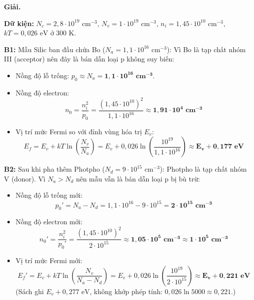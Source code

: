 \documentclass[11pt,a4paper]{article}
\renewcommand{\boldsymbol}[1]{\symbf{#1}}
\let\DeBaiOriginal\DeBai
\renewcommand{\DeBai}[1]{\par\Needspace{5\baselineskip}\DeBaiOriginal{#1}}
\begin{document}

\textbf{Giải.}

\textbf{Dữ kiện:} $N_c = 2{,}8 \cdot 10^{19}\text{ cm}^{-3}$, $N_v = 1 \cdot 10^{19}\text{ cm}^{-3}$, $n_i = 1{,}45 \cdot 10^{10}\text{ cm}^{-3}$, $kT = 0{,}026\text{ eV}$ ở $300\text{ K}$.

\textbf{B1:} Mẫu Silic ban đầu chứa Bo ($N_a = 1{,}1 \cdot 10^{16}\text{ cm}^{-3}$):
Vì Bo là tạp chất nhóm III (acceptor) nên đây là bán dẫn loại p không suy biến:
\begin{itemize}[leftmargin=*, topsep=1pt, itemsep=1pt]
  \item Nồng độ lỗ trống: $p_0 \approx N_a = \boldsymbol{1{,}1 \cdot 10^{16}\text{ cm}^{-3}}$.
  \item Nồng độ electron:
  \begin{equation*}
      n_0 = \frac{n_i^2}{p_0} = \frac{(1{,}45 \cdot 10^{10})^2}{1{,}1 \cdot 10^{16}} \approx \boldsymbol{1{,}91 \cdot 10^4\text{ cm}^{-3}}
  \end{equation*}
  \item Vị trí mức Fermi so với đỉnh vùng hóa trị $E_v$:
  \begin{equation*}
      E_f = E_v + kT \ln\left(\frac{N_v}{N_a}\right) = E_v + 0{,}026 \ln\left(\frac{10^{19}}{1{,}1 \cdot 10^{16}}\right) \approx \boldsymbol{E_v + 0{,}177\text{ eV}}
  \end{equation*}
\end{itemize}

\textbf{B2:} Sau khi pha thêm Photpho ($N_d = 9 \cdot 10^{15}\text{ cm}^{-3}$):
Photpho là tạp chất nhóm V (donor). Vì $N_a > N_d$ nên mẫu vẫn là bán dẫn loại p bị bù trừ:
\begin{itemize}[leftmargin=*, topsep=1pt, itemsep=1pt]
  \item Nồng độ lỗ trống mới:
  \begin{equation*}
      p_0' = N_a - N_d = 1{,}1 \cdot 10^{16} - 9 \cdot 10^{15} = \boldsymbol{2 \cdot 10^{15}\text{ cm}^{-3}}
  \end{equation*}
  \item Nồng độ electron mới:
  \begin{equation*}
      n_0' = \frac{n_i^2}{p_0'} = \frac{(1{,}45 \cdot 10^{10})^2}{2 \cdot 10^{15}} \approx \boldsymbol{1{,}05 \cdot 10^5\text{ cm}^{-3}} \approx \boldsymbol{1 \cdot 10^5\text{ cm}^{-3}}
  \end{equation*}
  \item Vị trí mức Fermi mới:
  \begin{equation*}
      E_f' = E_v + kT \ln\left(\frac{N_v}{N_a - N_d}\right) = E_v + 0{,}026 \ln\left(\frac{10^{19}}{2 \cdot 10^{15}}\right) \approx \boldsymbol{E_v + 0{,}221\text{ eV}}
  \end{equation*}
  (Sách ghi $E_v+0{,}277\text{ eV}$, không khớp phép tính: $0{,}026\ln5000\approx0{,}221$.)
\end{itemize}
\end{document}
